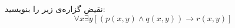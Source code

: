 \EXERCISE
نقیض گزاره‌ی زیر را بنویسید:
$$\forall x \exists y [(p(x, y) \wedge q(x, y)) \rightarrow r(x, y)]$$